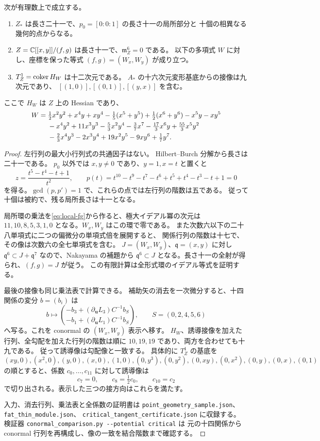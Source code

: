\begin{proposition}[局所点族の有限データ]\label{prop:local-data}
次が有理数上で成立する。
\begin{enumerate}
\item $Z_*$ は長さ二十一で、$p_0=[0:0:1]$ の長さ十一の局所部分と
十個の相異なる幾何的点からなる。
\item $Z=\mathbb C[[x,y]]/(f,g)$ は長さ十一で、$\mathfrak m_Z^6=0$ である。
以下の多項式 $W$ に対し、座標を保った等式 $(f,g)=(W_x,W_y)$ が成り立つ。
\item $T^1_Z=\operatorname{coker} H_W$ は十二次元である。
$A_*$ の十六次元変形基底からの接像は九次元であり、
$[(1,0)],[(0,1)],[(y,x)]$ を含む。
\end{enumerate}
ここで $H_W$ は $Z$ 上の Hessian であり、
\begin{align}
 W={}&\tfrac12x^2y^2+x^4y+xy^4-\tfrac15(x^5+y^5)
       +\tfrac12(x^6+y^6)-x^5y-xy^5 \notag\\
 &-x^4y^2+11x^3y^3-\tfrac53x^2y^4
       -\tfrac37x^7-\tfrac{17}3x^6y+\tfrac{55}3x^5y^2 \notag\\
 &-\tfrac23x^4y^3-2x^3y^4+19x^2y^5-9xy^6+\tfrac17y^7.
 \label{eq:W}
\end{align}
\end{proposition}
\begin{proof}
左行列の最大小行列式の共通因子はない。
Hilbert--Burch 分解から長さは二十一である。
$p_0$ 以外では $x,y\ne0$ であり、$y=1,x=t$ と置くと
\[
 z=\frac{t^5-t^4-t+1}{t^2},\qquad
 p(t)=t^{10}-t^9-t^7-t^6+t^5+t^4-t^3-t+1=0
\]
を得る。$\gcd(p,p')=1$ で、これらの点では左行列の階数は五である。
従って十個は被約で、残る局所長さは十一となる。

局所環の乗法を\eqref{eq:local-fg}から作ると、極大イデアル冪の次元は
$11,10,8,5,3,1,0$ となる。$W_x,W_y$ はこの環で零である。
また次数六以下の二十八単項式に二つの偏微分の単項式倍を展開すると、
関係行列の階数は十七で、その像は次数六の全七単項式を含む。
$J=(W_x,W_y)$、$\mathfrak q=(x,y)$ に対し
$\mathfrak q^6\subset J+\mathfrak q^7$ なので、Nakayama の補題から
$\mathfrak q^6\subset J$ となる。長さ十一の全射が得られ、$(f,g)=J$ が従う。
この有限計算は全形式環のイデアル等式を証明する。

最後の接像も同じ乗法表で計算できる。
補助矢の消去を一次微分すると、十四関係の変分 $b=(b_i)$ は
\[
 b\longmapsto
 \binom{-b_3+(\partial_{\mathbf u}L_3)C^{-1}b_S}
       {-b_1+(\partial_{\mathbf u}L_1)C^{-1}b_S},\qquad
 S=(0,2,4,5,6)
\]
へ写る。これを conormal の $(W_x,W_y)$ 表示へ移す。
$H_W$、誘導接像を加えた行列、全勾配を加えた行列の階数は順に
$10,19,19$ であり、両方を合わせても十九である。
従って誘導像は勾配像と一致する。
具体的に $T^1_Z$ の基底を
\[
 (xy,0),(x^2,0),(y,0),(x,0),(1,0),(0,y^3),
 (0,y^2),(0,xy),(0,x^2),(0,y),(0,x),(0,1)
\]
の順とすると、係数 $c_0,\ldots,c_{11}$ に対して誘導像は
\[
 c_7=0,\qquad c_8=\tfrac12c_0,\qquad c_{10}=c_2
\]
で切り出される。表示した三つの接方向はこれらを満たす。

入力、消去行列、乗法表と全係数の証明書は
\nolinkurl{point_geometry_sample.json}、\nolinkurl{fat_thin_module.json}、
\nolinkurl{critical_tangent_certificate.json} に収録する。
検証器 \nolinkurl{conormal_comparison.py --potential critical} は
元の十四関係から conormal 行列を再構成し、像の一致を結合階数まで確認する。
\end{proof}

